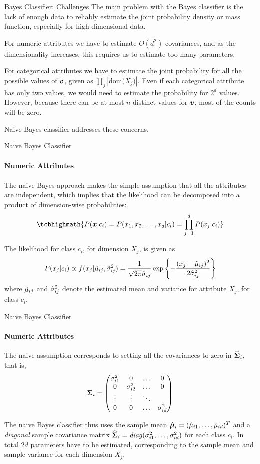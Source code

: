   \begin{frame}{Bayes Classifier: Challenges}
The main problem with the Bayes classif\/{i}er is the lack of enough
data to reliably estimate the joint probability density or mass
function, especially for high-dimensional data. 

\bigskip
For
numeric attributes we have to estimate $O(d^2)$ covariances, and
as the dimensionality increases, this requires us to estimate too
many parameters. 

\medskip
For categorical attributes we have to estimate
the joint probability for all the possible values of ${\boldsymbol v}$, given
as $\prod_{j} |\text{dom}\bigl(X_{j}\bigr)|$. Even if each categorical attribute
has only two values, we would need to estimate the probability for
$2^d$ values. However, because there can be at most $n$ distinct
values for ${\boldsymbol v}$, most of the counts will be zero. 

\medskip
Naive Bayes classifier addresses these concerns.
\end{frame}


\begin{frame}{Naive Bayes Classif\/{i}er}
\framesubtitle{Numeric Attributes}
The naive Bayes approach makes the simple assumption
that all the attributes are independent, which
implies that the likelihood
can be decomposed into a product of dimension-wise probabilities:
\begin{align*}
\tcbhighmath{
P(\bx | c_i) = P(x_1,x_2,\ldots,x_d | c_i) = \prod_{j=1}^d P(x_{j} |
c_i) 
}
\end{align*}

 The
likelihood for class $c_i$, for dimension $X_{j}$, is given as
\begin{align*}
    P(x_{j}|c_i) \propto f(x_{j} | \hat{\mu}_{ij}, \hat{\sigma}_{ij}^2)  = {1\over
    \sqrt{2\pi}\hat{\sigma}_{ij}}\exp\left\{ -{(x_{j} - \hat{\mu}_{ij})^2 \over
    2\hat{\sigma}_{ij}^2}\right\}
\end{align*}
where $\hat{\mu}_{ij}$ and
$\hat{\sigma}_{ij}^2$ denote the estimated
mean and variance for attribute $X_{j}$,
for class $c_i$.
\end{frame}


\begin{frame}{Naive Bayes Classif\/{i}er}
\framesubtitle{Numeric Attributes}
The naive assumption corresponds to setting all the
covariances to zero in $\widehat{{\bm \Sigma}}_i$, that is,
\begin{align*}
  {\bm \Sigma}_i = \begin{pmatrix} 
      \sigma_{i1}^2 & 0 & \ldots & 0\\
      0 & \sigma_{i2}^2 & \ldots & 0\\
      \vdots & \vdots & \ddots\\
      0 &  0 & \ldots & \sigma_{id}^2 \end{pmatrix}
\end{align*}

The naive Bayes classif\/{i}er thus 
uses the sample mean $\hat{{\bm \mu}}_i =
(\hat{\mu}_{i1}, \dots, \hat{\mu}_{id})^T$
and a {\em diagonal} sample covariance matrix $\widehat{{\bm \Sigma}}_i =
\mathit{diag}(\sigma_{i1}^2, \dots, \sigma_{id}^2)$
for each class $c_i$.
In total $2d$ parameters have to be estimated,
corresponding
to the sample mean and sample variance for each
dimension $X_{j}$.
\end{frame}




